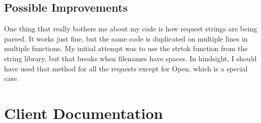 \documentclass[a4paper,12pt]{article}
\begin{document}
\subsection{Possible Improvements}
One thing that really bothers me about my code is how request strings
are being parsed. It works just fine, but the same code is duplicated
on multiple lines in multiple functions. My initial attempt was to use
the strtok function from the string library, but that breaks when
filenames have spaces. In hindsight, I should have used that method
for all the requests except for Open, which is a special case.

\section{Client Documentation}
\end{document}
